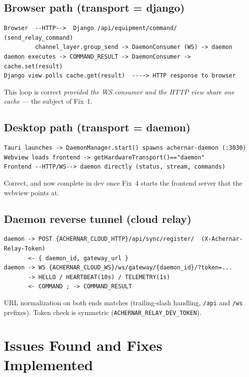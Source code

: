 \documentclass[11pt]{article}
\begin{document}
\subsection{Browser path (transport = django)}
\begin{lstlisting}
Browser  --HTTP-->  Django /api/equipment/command/  (send_relay_command)
         channel_layer.group_send -> DaemonConsumer (WS) -> daemon
daemon executes -> COMMAND_RESULT -> DaemonConsumer -> cache.set(result)
Django view polls cache.get(result)  ----> HTTP response to browser
\end{lstlisting}
This loop is correct \emph{provided the WS consumer and the HTTP view share one cache} --- the subject of
Fix~1.

\subsection{Desktop path (transport = daemon)}
\begin{lstlisting}
Tauri launches -> DaemonManager.start() spawns achernar-daemon (:3030)
Webview loads frontend -> getHardwareTransport()=="daemon"
Frontend --HTTP/WS--> daemon directly (status, stream, commands)
\end{lstlisting}
Correct, and now complete in dev once Fix~4 starts the frontend server that the webview points at.

\subsection{Daemon reverse tunnel (cloud relay)}
\begin{lstlisting}
daemon -> POST {ACHERNAR_CLOUD_HTTP}/api/sync/register/  (X-Achernar-Relay-Token)
       <- { daemon_id, gateway_url }
daemon -> WS {ACHERNAR_CLOUD_WS}/ws/gateway/{daemon_id}/?token=...
       -> HELLO / HEARTBEAT(10s) / TELEMETRY(1s)
       <- COMMAND ; -> COMMAND_RESULT
\end{lstlisting}
URL normalization on both ends matches (trailing-slash handling, \texttt{/api} and \texttt{/ws} prefixes).
Token check is symmetric (\texttt{ACHERNAR\_RELAY\_DEV\_TOKEN}).

\section{Issues Found and Fixes Implemented}\label{sec:fixes}
\end{document}
